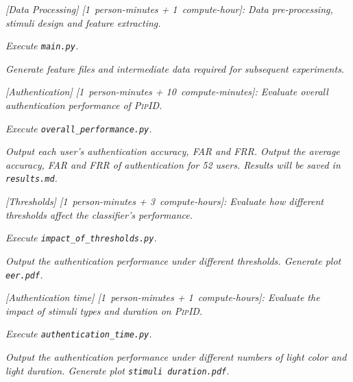 \documentclass[sigconf]{acmart}
\newcommand{\sysname}{\textsc{PipID}\xspace}
\begin{document}
\bigskip
\begin{compactitem}
\item[(E1):]
  \emph{[Data Processing] [1~person-minutes + 1~compute-hour]: Data pre-processing, stimuli design and feature extracting.}

  \begin{asparadesc}
  \item[Execution:] \emph{Execute \texttt{main.py}.}

  \item[Results:] \emph{Generate feature files and intermediate data required for subsequent experiments.}
  \end{asparadesc}

\item[(E2):] \emph{[Authentication] [1~person-minutes + 10~compute-minutes]: Evaluate overall authentication performance of \sysname.}
  \begin{asparadesc}
  \item[Execution:] \emph{Execute \texttt{overall\_performance.py}.}

  \item[Results:] \emph{Output each user's authentication accuracy, FAR and FRR. Output the average accuracy, FAR and FRR of authentication for 52 users. Results will be saved in \texttt{results.md}.}
  \end{asparadesc}

\item[(E3):] \emph{[Thresholds] [1~person-minutes + 3~compute-hours]: Evaluate how different thresholds affect the classifier’s performance.}
  \begin{asparadesc}
  \item[Execution:] \emph{Execute \texttt{impact\_of\_thresholds.py}.}

  \item[Results:] \emph{Output the authentication performance under different thresholds. Generate plot \texttt{eer.pdf}.}
  \end{asparadesc}

\item[(E4):] \emph{[Authentication time] [1~person-minutes + 1~compute-hours]: Evaluate the impact of stimuli types and duration on \sysname.}
  \begin{asparadesc}
  \item[Execution:] \emph{Execute \texttt{authentication\_time.py}.}

  \item[Results:] \emph{Output the authentication performance under different numbers of light color and light duration. Generate plot \texttt{stimuli duration.pdf}.}
  \end{asparadesc}


\end{compactitem}
\end{document}
